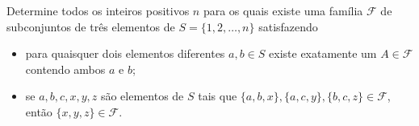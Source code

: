 Determine todos os inteiros positivos \(n\) para os quais existe uma família \(\mathcal{F}\) de subconjuntos de três elementos de \(S=\{1,2,\dots,n\}\) satisfazendo
\begin{itemize}
\item[(i)] para quaisquer dois elementos diferentes \(a,b \in S\) existe exatamente um \(A \in \mathcal{F}\) contendo ambos \(a\) e \(b\);
\item[(ii)] se \(a,b,c,x,y,z\) são elementos de \(S\) tais que \(\{a,b,x\},\{a,c,y\},\{b,c,z\} \in \mathcal{F}\), então \(\{x,y,z\} \in \mathcal{F}\).
\end{itemize}
